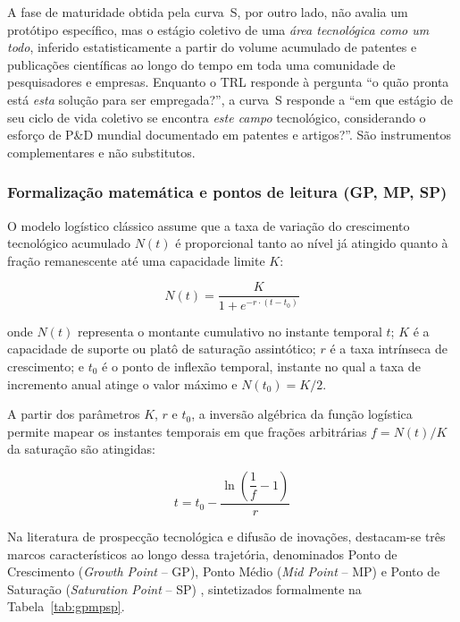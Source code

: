 \documentclass[12pt, a4paper]{article}
\begin{document}
  A fase de maturidade obtida pela curva~S, por outro lado, não avalia um
protótipo específico, mas o estágio coletivo de uma \emph{área tecnológica como
um todo}, inferido estatisticamente a partir do volume acumulado de patentes e
publicações científicas ao longo do tempo em toda uma comunidade de
pesquisadores e empresas. Enquanto o TRL responde à pergunta ``o quão pronta
está \emph{esta} solução para ser empregada?'', a curva~S responde a ``em que
estágio de seu ciclo de vida coletivo se encontra \emph{este campo}
tecnológico, considerando o esforço de P\&D mundial documentado em patentes e
artigos?''. São instrumentos complementares e não substitutos.

    \subsubsection{Formalização matemática e pontos de leitura (GP, MP, SP)}

  O modelo logístico clássico assume que a taxa de variação do crescimento
tecnológico acumulado $N(t)$ é proporcional tanto ao nível já atingido quanto à fração
remanescente até uma capacidade limite $K$:

$$N(t) = \frac{K}{1 + e^{-r \cdot (t - t_0)}}$$

  onde $N(t)$ representa o montante cumulativo no instante temporal $t$; $K$ é a capacidade de suporte
ou platô de saturação assintótico; $r$ é a taxa intrínseca de crescimento; e
$t_0$ é o ponto de inflexão temporal, instante no qual a taxa de incremento anual
atinge o valor máximo e $N(t_0) = K/2$.

  A partir dos parâmetros $K$, $r$ e $t_0$, a inversão algébrica da função logística permite mapear
os instantes temporais em que frações arbitrárias $f = N(t)/K$ da saturação são atingidas:

$$t = t_0 - \frac{\ln\left(\dfrac{1}{f} - 1\right)}{r}$$

  Na literatura de prospecção tecnológica e difusão de inovações, destacam-se três marcos
característicos ao longo dessa trajetória, denominados Ponto de Crescimento (\textit{Growth Point} -- GP),
Ponto Médio (\textit{Mid Point} -- MP) e Ponto de Saturação (\textit{Saturation Point} -- SP) \cite{ernst1997, reptec2023tetra},
sintetizados formalmente na Tabela~\ref{tab:gpmpsp}.
\end{document}
